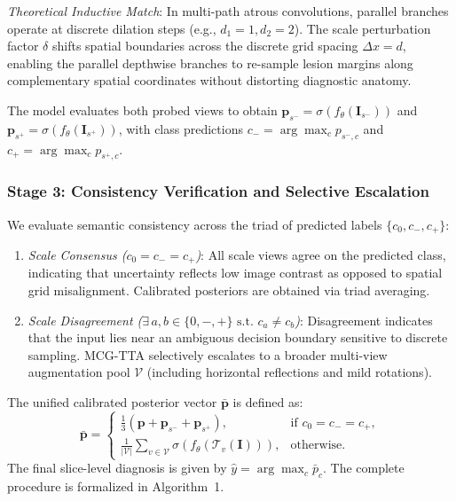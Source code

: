\emph{Theoretical Inductive Match}: In multi-path atrous convolutions, parallel branches operate at discrete dilation steps (e.g., $d_1 = 1, d_2 = 2$). The scale perturbation factor $\delta$ shifts spatial boundaries across the discrete grid spacing $\Delta x = d$, enabling the parallel depthwise branches to re-sample lesion margins along complementary spatial coordinates without distorting diagnostic anatomy.

The model evaluates both probed views to obtain $\mathbf{p}_{s^-} = \sigma(f_\theta(\mathbf{I}_{s^-}))$ and $\mathbf{p}_{s^+} = \sigma(f_\theta(\mathbf{I}_{s^+}))$, with class predictions $c_- = \arg\max_c p_{s^-, c}$ and $c_+ = \arg\max_c p_{s^+, c}$.

\subsubsection{Stage 3: Consistency Verification and Selective Escalation}
We evaluate semantic consistency across the triad of predicted labels $\{c_0, c_-, c_+\}$:
\begin{enumerate}
\item \emph{Scale Consensus ($c_0 = c_- = c_+$)}: All scale views agree on the predicted class, indicating that uncertainty reflects low image contrast as opposed to spatial grid misalignment. Calibrated posteriors are obtained via triad averaging.
\item \emph{Scale Disagreement ($\exists \, a, b \in \{0, -, +\} \text{ s.t. } c_a \ne c_b$)}: Disagreement indicates that the input lies near an ambiguous decision boundary sensitive to discrete sampling. MCG-TTA selectively escalates to a broader multi-view augmentation pool $\mathcal{V}$ (including horizontal reflections and mild rotations).
\end{enumerate}

The unified calibrated posterior vector $\bar{\mathbf{p}}$ is defined as:
\begin{equation}
\bar{\mathbf{p}} = \begin{cases}
\frac{1}{3}\left(\mathbf{p} + \mathbf{p}_{s^-} + \mathbf{p}_{s^+}\right), & \text{if } c_0 = c_- = c_+, \\[1.2ex]
\frac{1}{|\mathcal{V}|} \sum_{v \in \mathcal{V}} \sigma\left(f_\theta(\mathcal{T}_v(\mathbf{I}))\right), & \text{otherwise.}
\end{cases}
\label{eq:mcg_aggregation}
\end{equation}
The final slice-level diagnosis is given by $\hat{y} = \arg\max_c \bar{p}_c$. The complete procedure is formalized in Algorithm~1.

